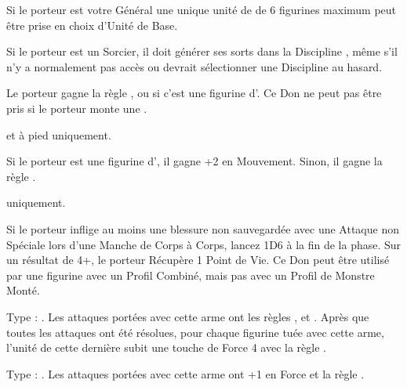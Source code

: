 \begin{multicols}{2}
Si le porteur est votre Général une unique unité de \wastelandtrolls{} de 6 figurines maximum peut être prise en choix d'Unité de Base.

Si le porteur est un Sorcier, il doit générer ses sorts dans la Discipline \wilderness{}, même s'il n'y a normalement pas accès ou devrait sélectionner une Discipline au hasard.

 Le porteur gagne la règle , ou  si c'est une figurine d'\infantry{}. Ce Don ne peut pas être pris si le porteur monte une \manticore{}.

 \textbf{\dlust} et à pied uniquement.

Si le porteur est une figurine d'\infantry{}, il gagne +2 en Mouvement. Sinon, il gagne la règle \swiftstride{}.

 \textbf{\wrath} uniquement.

Si le porteur inflige au moins une blessure non sauvegardée avec une Attaque non Spéciale lors d'une Manche de Corps à Corps, lancez 1D6 à la fin de la phase. Sur un résultat de 4+, le porteur Récupère 1 Point de Vie. Ce Don peut être utilisé par une figurine avec un Profil Combiné, mais pas avec un Profil de Monstre Monté.

\endpricelistNSP

\end{multicols}

\closearmynewsection









\startarmymagicalitems

\armymagicalweapons

\startpricelist

 Type : \hw{}. Les attaques portées avec cette arme ont les règles \flamingattacks{},  et . Après que toutes les attaques ont été résolues, pour chaque figurine tuée avec cette arme, l'unité de cette dernière subit une touche de Force 4 avec la règle \flamingattacks{}.

 Type : \spear{}. Les attaques portées avec cette arme ont +1 en Force et la règle .

\endpricelist

\armymagicalarmour

